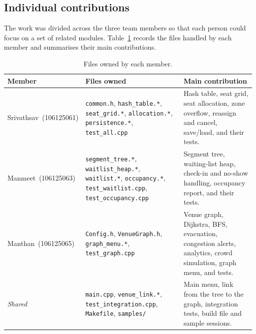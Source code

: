 \documentclass[11pt,a4paper]{article}
\newcommand{\MemberOne}{Srivathsav}
\newcommand{\RegOne}{106125061}
\newcommand{\MemberTwo}{Manmeet}
\newcommand{\RegTwo}{106125063}
\newcommand{\MemberThree}{Manthan}
\newcommand{\RegThree}{106125065}
\newcommand{\code}[1]{\texttt{#1}}
\begin{document}
\subsection{Individual contributions}
The work was divided across the three team members so that each person could
focus on a set of related modules. Table~\ref{tab:files} records the files
handled by each member and summarises their main contributions.

\begin{table}[H]
\centering
\small
\begin{tabularx}{\textwidth}{@{}>{\raggedright\arraybackslash}p{3.3cm}>{\raggedright\arraybackslash}p{5.2cm}>{\raggedright\arraybackslash}X@{}}
\toprule
\textbf{Member} & \textbf{Files owned} & \textbf{Main contribution}\\
\midrule
\MemberOne\ (\RegOne) & \code{common.h}, \code{hash\_table.*}, \code{seat\_grid.*}, \code{allocation.*}, \code{persistence.*}, \code{test\_all.cpp} & Hash table, seat grid, seat allocation, zone overflow, reassign and cancel, save/load, and their tests.\\
\MemberTwo\ (\RegTwo) & \code{segment\_tree.*}, \code{waitlist\_heap.*}, \code{waitlist.*}, \code{occupancy.*}, \code{test\_waitlist.cpp}, \code{test\_occupancy.cpp} & Segment tree, waiting-list heap, check-in and no-show handling, occupancy report, and their tests.\\
\MemberThree\ (\RegThree) & \code{Config.h}, \code{VenueGraph.h}, \code{graph\_menu.*}, \code{test\_graph.cpp} & Venue graph, Dijkstra, BFS, evacuation, congestion alerts, analytics, crowd simulation, graph menu, and tests.\\
\textit{Shared} & \code{main.cpp}, \code{venue\_link.*}, \code{test\_integration.cpp}, \code{Makefile}, \code{samples/} & Main menu, link from the tree to the graph, integration tests, build file and sample sessions.\\
\bottomrule
\end{tabularx}
\caption{Files owned by each member.}
\label{tab:files}
\end{table}
\end{document}
